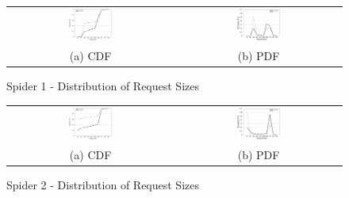 \begin{figure}[!t]
\begin{center}
\begin{tabular}{cc}
\hspace*{-1cm}                                                           
{\includegraphics[width=0.27\textwidth]{./figs/spider1-reqSizeCDF.eps}}&
\hspace{-2mm}
{\includegraphics[width=0.27\textwidth]{./figs/spider1-reqSizePDF.eps}}\\
\small (a) CDF & \small(b) PDF \\
\end{tabular}
\vspace{-0.1in}
\captionsetup{justification=centering}
\caption{Spider 1 - Distribution of Request Sizes}
\label{fig:spider1-reqsizedist}
\end{center}
\end{figure}

\begin{figure}[!t]
\begin{center}
\begin{tabular}{cc}
\hspace*{-1cm}                                                           
{\includegraphics[width=0.27\textwidth]{./figs/spider2-reqSizeCDF.eps}}&
\hspace{-2mm}
{\includegraphics[width=0.27\textwidth]{./figs/spider2-reqSizePDF.eps}}\\
\small (a) CDF & \small(b) PDF \\
\end{tabular}
\vspace{-0.1in}
\caption{Spider 2 - Distribution of Request Sizes}
\label{fig:spider2-reqsizedist}
\end{center}
\end{figure}


